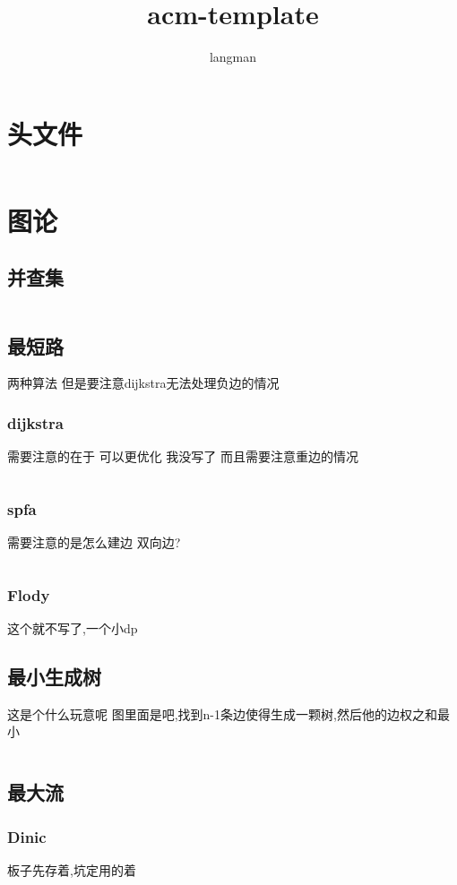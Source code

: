 \documentclass[a4paper,11pt]{article}
\author{langman}
\title{acm-template}
\begin{document}
\maketitle
\begin{CJK}{UTF8}{gbsn}
\section{头文件}

\inputminted{c++}{../scoure/head.cpp}
\newpage
\section{图论}
\subsection{并查集}
\inputminted{c++}{../scoure/Graph_theory/bingchick.cpp}
\newpage
\subsection{最短路}
两种算法 但是要注意dijkstra无法处理负边的情况
\subsubsection{dijkstra}
需要注意的在于 可以更优化 我没写了 而且需要注意重边的情况
\inputminted{c++}{../scoure/Graph_theory/dijkstra.cpp}
\subsubsection{spfa}
需要注意的是怎么建边 双向边?
\inputminted{c++}{../scoure/Graph_theory/spfa.cpp}
\subsubsection{Flody}
这个就不写了,一个小dp
\subsection{最小生成树}
这是个什么玩意呢 图里面是吧,找到n-1条边使得生成一颗树,然后他的边权之和最小
\inputminted{c++}{../scoure/Graph_theory/prime.cpp}
\subsection{最大流}
\subsubsection{Dinic}
板子先存着,坑定用的着
\inputminted{c++}{../scoure/Graph_theory/dinic.cpp}



\end{CJK}
\end{document}
